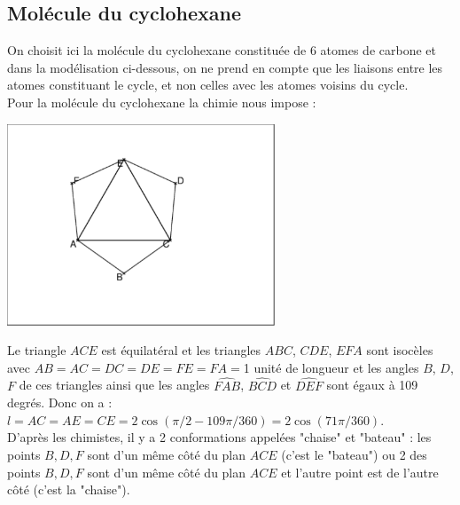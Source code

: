 \documentclass[a4paper,11pt]{book}
\begin{document}
\subsection{Mol\'ecule du cyclohexane}
On choisit ici la mol\'ecule du cyclohexane constitu\'ee de 6 atomes de
carbone et dans la mod\'elisation ci-dessous, on ne prend en compte que les 
liaisons entre les atomes constituant le cycle, et non celles avec les atomes 
voisins du cycle.\\
Pour la mol\'ecule du cyclohexane la chimie nous impose :
\begin{center}\includegraphics[width=8cm]{cyclohex}\end{center}
Le triangle $ACE$ est \'equilat\'eral et les triangles $ABC$, $CDE$, $EFA$ sont 
isoc\`eles avec $AB=AC=DC=DE=FE=FA=$1 unit\'e de longueur et les angles $B$, 
$D$, $F$ de ces triangles ainsi que les angles $\widehat{FAB}$, 
$\widehat{BCD}$ et $\widehat{DEF}$ sont \'egaux \`a 109 degr\'es.
Donc on a :\\
$l=AC=AE=CE=2\cos(\pi/2-109\pi/360)=2\cos(71\pi/360)$.\\
D'apr\`es les chimistes, il y a 2 conformations appel\'ees 
"chaise" et "bateau" : les points $B,D,F$ sont d'un m\^eme c\^ot\'e du plan 
$ACE$ (c'est le "bateau") ou 2 des points $B,D,F$ sont d'un m\^eme c\^ot\'e du
plan $ACE$ et l'autre point est de l'autre c\^ot\'e (c'est la "chaise").
\end{document}
